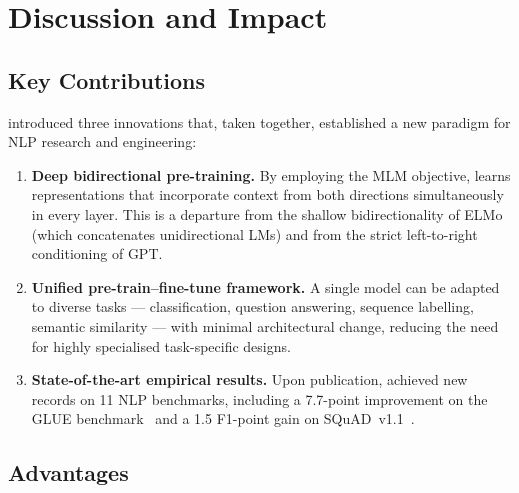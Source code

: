 
\section{Discussion and Impact}
\label{sec:discussion}

\subsection{Key Contributions}
\label{subsec:contributions}

\bert{} introduced three innovations that, taken together, established a new paradigm
for NLP research and engineering:

\begin{enumerate}
  \item \textbf{Deep bidirectional pre-training.}  By employing the MLM objective,
        \bert{} learns representations that incorporate context from both directions
        simultaneously in every layer.  This is a departure from the shallow
        bidirectionality of ELMo (which concatenates unidirectional LMs) and from
        the strict left-to-right conditioning of GPT.

  \item \textbf{Unified pre-train–fine-tune framework.}  A single model can be
        adapted to diverse tasks --- classification, question answering, sequence
        labelling, semantic similarity --- with minimal architectural change,
        reducing the need for highly specialised task-specific designs.

  \item \textbf{State-of-the-art empirical results.}  Upon publication, \bert{}
        achieved new records on 11 NLP benchmarks, including a 7.7-point
        improvement on the GLUE benchmark~\cite{wang2018glue} and a 1.5 F1-point
        gain on SQuAD~v1.1~\cite{rajpurkar2016squad}.
\end{enumerate}

\subsection{Advantages}
\label{subsec:advantages}

